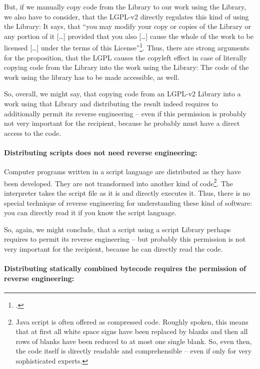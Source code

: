 But, if we manually copy code from the Library to our work using the Library, we
also have to consider, that the LGPL-v2 directly regulates this kind of using
the Library: It says, that \enquote{you may modify your copy or copies of the
Library or any portion of it [\ldots] provided that you also [\ldots] cause the
whole of the work to be licensed [\ldots] under the terms of this
License}\footcite[cf.][\nopage wp., §2, escpcially §2c]{Lgpl21OsiLicense1999a}.
Thus, there are strong arguments for the proposition, that the LGPL causes the
copyleft effect in case of literally copying code from the Library into the work
using the Library: The code of the work using the library has to be made
accessible, as well.

So, overall, we might say, that copying code from an LGPL-v2 Library into a work
using that Library and distributing the result indeed requires to additionally
permit its reverse engineering -- even if this permission is probably not very
important for the recipient, because he probably must have a direct access to
the code.

\paragraph{Distributing scripts does not need reverse engineering:}

Computer programs written in a script language are distributed as they have been
developed. They are not transformed into another kind of code\footnote{Java
script is often offered as compressed code. Roughly spoken, this means that at
first all white space signs have been replaced by blanks and then all rows of
blanks have been reduced to at most one single blank. So, even then, the code
itself is directly readable and comprehensible -- even if only for very
sophisticated experts.}. The interpreter takes the script file as it is and
directly executes it. Thus, there is no special technique of reverse engineering
for understanding these kind of software: you can directly read it if you know
the script language.

So, again, we might conclude, that a script using a script Library perhaps
requires to permit its reverse engineering -- but probably this permission is
not very important for the recipient, because he can directly read the code.

\paragraph{Distributing statically combined bytecode requires the
permission of reverse engineering:}

